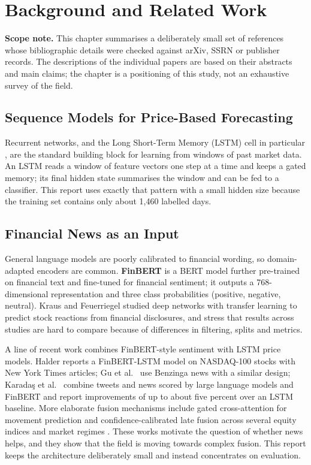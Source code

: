 \newpage
\section{Background and Related Work}\label{ch:related}
\begin{infobox}
\textbf{Scope note.} This chapter summarises a deliberately small set of references whose bibliographic details were checked against arXiv, SSRN or publisher records. The descriptions of the individual papers are based on their abstracts and main claims; the chapter is a positioning of this study, not an exhaustive survey of the field.
\end{infobox}

\subsection{Sequence Models for Price-Based Forecasting}
Recurrent networks, and the Long Short-Term Memory (LSTM) cell in particular \cite{hochreiter1997}, are the standard building block for learning from windows of past market data. An LSTM reads a window of feature vectors one step at a time and keeps a gated memory; its final hidden state summarises the window and can be fed to a classifier. This report uses exactly that pattern with a small hidden size because the training set contains only about 1{,}460 labelled days.

\subsection{Financial News as an Input}
General language models are poorly calibrated to financial wording, so domain-adapted encoders are common. \textbf{FinBERT} \cite{araci2019} is a BERT model further pre-trained on financial text and fine-tuned for financial sentiment; it outputs a 768-dimensional representation and three class probabilities (positive, negative, neutral). Kraus and Feuerriegel \cite{kraus2017} studied deep networks with transfer learning to predict stock reactions from financial disclosures, and stress that results across studies are hard to compare because of differences in filtering, splits and metrics.

A line of recent work combines FinBERT-style sentiment with LSTM price models. Halder \cite{halder2022} reports a FinBERT-LSTM model on NASDAQ-100 stocks with New York Times articles; Gu et al.\ \cite{gu2024} use Benzinga news with a similar design; Karada\c{s} et al.\ \cite{karadas2025} combine tweets and news scored by large language models and FinBERT and report improvements of up to about five percent over an LSTM baseline. More elaborate fusion mechanisms include gated cross-attention for movement prediction \cite{zong2024} and confidence-calibrated late fusion across several equity indices and market regimes \cite{wang2026}. These works motivate the question of whether news helps, and they show that the field is moving towards complex fusion. This report keeps the architecture deliberately small and instead concentrates on evaluation.

